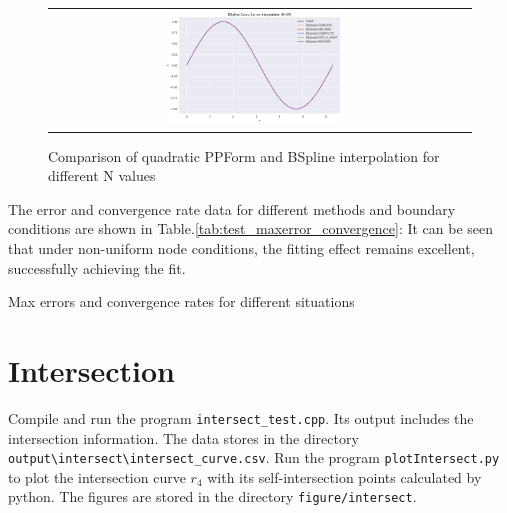 \documentclass[a4paper]{article}
\begin{document}
\begin{sloppypar}
\begin{figure}[H]
\begin{tabular}{cc}
    \includegraphics[width=0.45\textwidth]{../figure/test/BSpline3_N91.png}  \\
  \end{tabular}
  \renewcommand{\figurename}{Fig.}
  \caption{Comparison of quadratic PPForm and BSpline interpolation for different N values}
  \label{fig:test_quadratic}
\end{figure}

The error and convergence rate data for different methods and boundary conditions are shown in Table.\ref{tab:test_maxerror_convergence}:
It can be seen that under non-uniform node conditions, the fitting effect remains excellent, successfully achieving the fit.

\begin{table}[H]
  \centering
  \renewcommand{\tablename}{Table.}
  \caption{Max errors and convergence rates for different situations}
  \label{tab:test_maxerror_convergence}
\end{table}

\section{Intersection}
Compile and run the program \verb|intersect_test.cpp|. Its output includes the intersection information. The data stores in the directory \verb|output\intersect\intersect_curve.csv|.
Run the program \verb|plotIntersect.py| to plot the intersection curve $r_4$ with its self-intersection points calculated by python. The figures are stored in the directory \verb|figure/intersect|.


\end{sloppypar}
\end{document}
